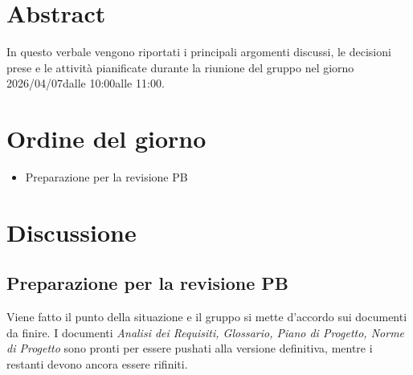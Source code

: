 \documentclass[a4paper,12pt]{article}
\newcommand{\DataVerbale}{2026/04/07}
\newcommand{\OraInizio}{10:00}
\newcommand{\OraFine}{11:00}
\newcommand{\AbstractVerbale}{%
In questo verbale vengono riportati i principali argomenti discussi, le decisioni prese e le attività pianificate durante la riunione del gruppo nel giorno \DataVerbale \space dalle \OraInizio \space alle \OraFine.
}
\begin{document}
\newpage

\tableofcontents

\newpage
\section{Abstract}{
    \begin{minipage}{0.9\textwidth}
        \small
        \AbstractVerbale
    \end{minipage}
}


\section{Ordine del giorno}{
    \begin{itemize}
        \item Preparazione per la revisione PB
    \end{itemize}
}


\section{Discussione}{
    \subsection{Preparazione per la revisione PB}
        Viene fatto il punto della situazione e il gruppo si mette d'accordo sui documenti da finire. I documenti \textit{Analisi dei Requisiti, Glossario, Piano di Progetto, Norme di Progetto} sono pronti per essere pushati alla versione definitiva, mentre i restanti devono ancora essere rifiniti.
     
}

\end{document}
